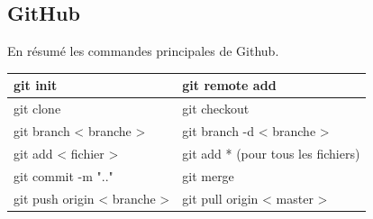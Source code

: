 \documentclass[a4paper, 12pt, twoside]{article}
\begin{document}
\subsection{GitHub}
En résumé les commandes principales de \textsf{Github}.
\begin{center}
\begin{tabular}{|l|l|}
\hline
git init & git remote add \\ \hline
git clone & git checkout \\ \hline
git branch < branche > &  git branch -d < branche > \\ \hline
git add < fichier > &  git add * (pour tous les fichiers) \\ \hline
git commit -m ".." &  git merge \\ \hline
git push origin < branche > & git pull origin < master >  \\ \hline
\end{tabular}
\end{center}
\end{document}

